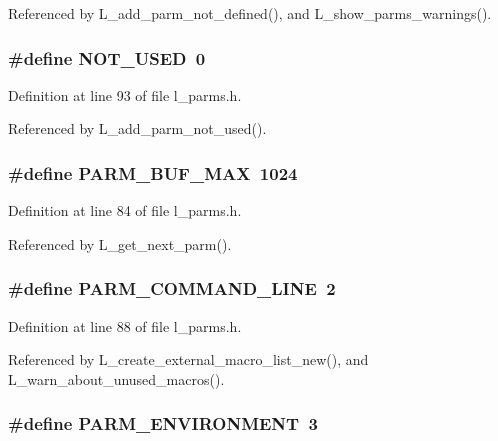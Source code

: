 Referenced by L\_\-add\_\-parm\_\-not\_\-defined(), and L\_\-show\_\-parms\_\-warnings().
\subsubsection{\setlength{\rightskip}{0pt plus 5cm}\#define NOT\_\-USED~0}\label{l__parms_8h_f19bd6c1a125bbcb95028adc2aaddfb1}




Definition at line 93 of file l\_\-parms.h.

Referenced by L\_\-add\_\-parm\_\-not\_\-used().
\subsubsection{\setlength{\rightskip}{0pt plus 5cm}\#define PARM\_\-BUF\_\-MAX~1024}\label{l__parms_8h_843182a0fe4b6533e1f4deb16dd0a0d6}




Definition at line 84 of file l\_\-parms.h.

Referenced by L\_\-get\_\-next\_\-parm().
\subsubsection{\setlength{\rightskip}{0pt plus 5cm}\#define PARM\_\-COMMAND\_\-LINE~2}\label{l__parms_8h_1a640842e587ffa5eb449243bd22014e}




Definition at line 88 of file l\_\-parms.h.

Referenced by L\_\-create\_\-external\_\-macro\_\-list\_\-new(), and L\_\-warn\_\-about\_\-unused\_\-macros().
\subsubsection{\setlength{\rightskip}{0pt plus 5cm}\#define PARM\_\-ENVIRONMENT~3}\label{l__parms_8h_5d4acb792ede1b47665aec760acf43d4}





